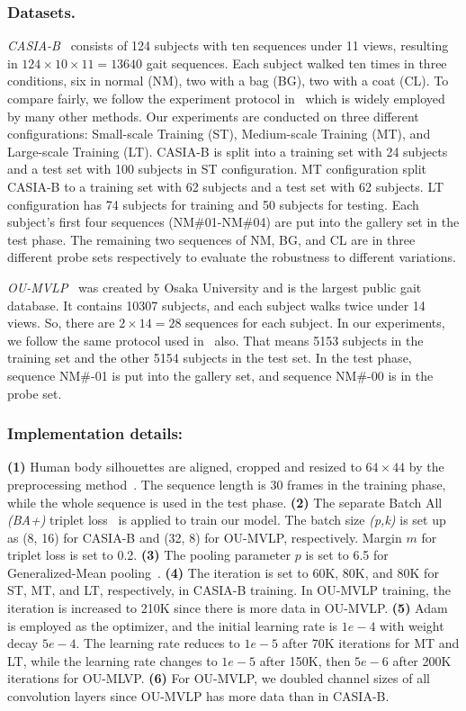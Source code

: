 \documentclass[runningheads]{llncs}
\begin{document}
\subsubsection{Datasets.}
\textit{CASIA-B}~\cite{casiab} consists of 124 subjects with ten sequences under 11 views, resulting in $124 \times 10 \times 11 = 13640$ gait sequences. Each subject walked ten times in three conditions, \ie six in normal (NM), two with a bag (BG),  two with a coat (CL). To compare fairly, we follow the experiment protocol in~\cite{aaai2019gaitset} which is widely employed by many other methods. Our experiments are conducted on three different configurations: Small-scale Training (ST), Medium-scale Training (MT), and Large-scale Training (LT). CASIA-B is split into a training set with 24 subjects and a test set with 100 subjects in ST configuration. MT configuration split CASIA-B to a training set with 62 subjects and a test set with 62 subjects. LT configuration has 74 subjects for training and 50 subjects for testing. Each subject's first four sequences (NM\#01-NM\#04) are put into the gallery set in the test phase. The remaining two sequences of NM, BG, and CL are in three different probe sets respectively to evaluate the robustness to different variations.

\textit{OU-MVLP}~\cite{oumvlp} was created by Osaka University and is the largest public gait database. It contains 10307 subjects, and each subject walks twice under 14 views. So, there are  $2 \times 14 = 28$ sequences for each subject. In our experiments, we follow the same protocol used in~\cite{aaai2019gaitset} also. That means 5153 subjects in the training set and the other 5154 subjects in the test set. In the test phase, sequence NM\#-01 is put into the gallery set, and sequence NM\#-00 is in the probe set.

\subsubsection{Implementation details:} \textbf{(1)} Human body silhouettes are aligned, cropped and resized to $64\times44$ by the preprocessing method~\cite{oumvlp}. The sequence length is 30 frames in the training phase, while the whole sequence is used in the test phase. \textbf{(2)} The separate Batch All \textit{(BA+)} triplet loss~\cite{triplet} is applied to train our model. The batch size \textit{(p,k)} is set up as (8, 16) for CASIA-B and (32, 8) for OU-MVLP, respectively. Margin $m$ for triplet loss is set to 0.2. \textbf{(3)} The pooling parameter $p$ is set to 6.5 for Generalized-Mean pooling~\cite{gem}.  \textbf{(4)} The iteration is set to 60K, 80K, and 80K for ST, MT, and LT, respectively, in CASIA-B training. In OU-MVLP training, the iteration is increased to 210K since there is more data in OU-MVLP. 
\textbf{(5)} Adam~\cite{adam} is employed as the optimizer, and the initial learning rate is $1e-4$ with weight decay $5e-4$. The learning rate reduces to $1e-5$ after 70K iterations for MT and LT, while the learning rate changes to $1e-5$ after 150K, then $5e-6$ after 200K iterations for OU-MLVP.
\textbf{(6)} For OU-MVLP, we doubled channel sizes of all convolution layers since OU-MVLP has more data than in CASIA-B.
\end{document}
